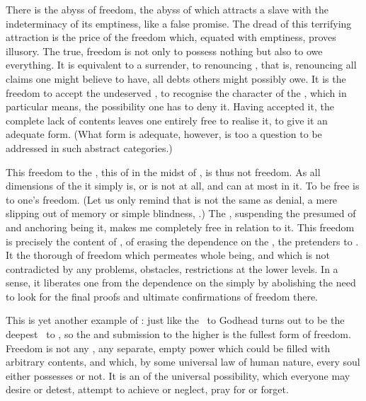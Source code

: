\pa There is the abyss of freedom, the abyss of  which attracts
a slave with the indeterminacy of its emptiness, like a false promise. The dread
of this terrifying attraction is the price of the freedom which, equated with
emptiness, proves illusory.  The true,  freedom is not only to
possess nothing but also to owe everything. It is equivalent to a surrender, to
renouncing , that is, renouncing all claims one might believe to
have, all debts others might possibly owe. It is the freedom to accept the
undeserved , 
to recognise the  character of the , which in
particular means, the possibility one has to deny it.  Having accepted it,
the complete lack of  contents leaves one entirely free to realise
it, to give it an adequate  form. (What form is adequate,
however, is too  a question to be addressed in such abstract
categories.) 

This freedom to  the , this  of
 in the midst of , is thus not 
freedom. As all dimensions of the  it simply is, or is not at all,
and  can at most  in it.  To be free is to 
one's freedom. (Let us only remind that  is not the same
as denial, a mere slipping out of memory or simple blindness, .)
The \yes, suspending 
the presumed  of  and anchoring  being
 it, makes me completely free in relation to it.  This freedom is
precisely the content of , of erasing the dependence on
the , the  pretenders to .  It 
the thorough  of freedom which 
permeates  whole being, and which is not contradicted by any problems,
obstacles, restrictions at the lower levels. In a sense, it liberates one from
the dependence on the  simply by abolishing the need to look
for the final proofs and ultimate confirmations of freedom there.


This is yet another example of : just like the \yes\ to Godhead
turns out to be the deepest \yes\ to , so the  and
submission to the higher  is the fullest form of freedom.
Freedom is  not any , any separate, empty power which could be
filled with arbitrary contents, and which, by some universal law of human
nature, every soul either possesses or not. It is an  of the
universal possibility, which everyone may desire or detest, attempt to achieve
or neglect, pray for or forget. 

